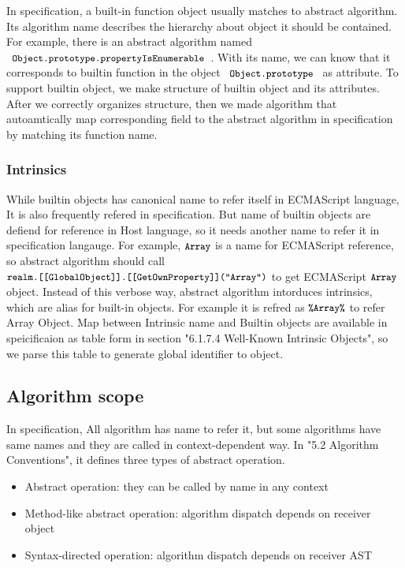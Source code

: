  In specification, a built-in function object usually matches to abstract algorithm. Its algorithm name
 describes the hierarchy about object it should be contained. For example, there is an abstract algorithm named \( \code{ Object.prototype.propertyIsEnumerable } \). With its name,
 we can know that it corresponds to builtin function in the object \( \code{ Object.prototype } \) as attribute. 
 To support builtin object, we make structure of builtin object and its attributes.
 After we correctly organizes structure, then we made algorithm that autoamtically map corresponding field to the abstract algorithm in specification by matching its function name.
 
 \subsubsection{Intrinsics}

 While builtin objects has canonical name to refer itself in ECMAScript language, It is also frequently refered in specification. But name of builtin objects
 are defiend for reference in Host language, so it needs another name to refer it in specification langauge. For example, \( \texttt{\small Array} \) is a name for
 ECMAScript reference, so abstract algorithm should call \\
 \( \texttt{\small realm.[[GlobalObject]].[[GetOwnProperty]]("Array")} \) to get ECMAScript \( \texttt{\small Array} \) object. Instead of this verbose way, abstract algorithm intorduces intrinsics, which
are alias for built-in objects. For example it is refred as \( \texttt{\small\%Array\%} \) to refer Array Object.
 Map between Intrinsic name and Builtin objects are available in speicificaion as table form in section "6.1.7.4 Well-Known Intrinsic Objects", so we parse this table to generate global identifier to object.

\subsection{Algorithm scope}

 In specification, All algorithm has name to refer it, but some algorithms have same names and they are called in context-dependent way.
In "5.2 Algorithm Conventions", it defines three types of abstract operation.
 \begin{itemize}
  \item Abstract operation: they can be called by name in any context
  \item Method-like abstract operation: algorithm dispatch depends on receiver object
  \item Syntax-directed operation: algorithm dispatch depends on receiver AST
  \end{itemize}

